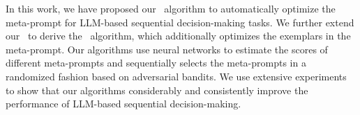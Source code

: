 In this work, we have proposed our \alg~algorithm
to automatically optimize the meta-prompt for LLM-based sequential decision-making tasks. We further extend our \alg~to derive the \alges~algorithm, which additionally optimizes the exemplars in the meta-prompt.
Our algorithms use neural networks to estimate the scores of different meta-prompts and sequentially selects the meta-prompts in a randomized fashion based on adversarial bandits.
We use extensive experiments to show that our algorithms considerably and consistently improve the performance of LLM-based sequential decision-making.
